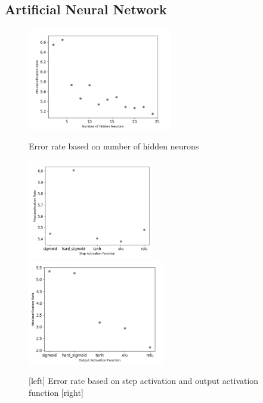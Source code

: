\documentclass{article}
\begin{document}
\subsection{Artificial Neural Network}
\begin{figure}[hbt!]
  \centering
  \includegraphics[width=6.3cm]{ann_hidden.png}
  \caption{Error rate based on number of hidden neurons}
  \includegraphics[width=5.5cm]{ann_step.png}
  \includegraphics[width=6cm]{ann_output.png}
  \caption{[left] Error rate based on step activation and output activation function [right]}
\end{figure}
\end{document}
